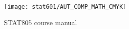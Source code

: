 
\texttt{[image: stat601/AUT\_COMP\_MATH\_CMYK]}

\begin{centering}
{\Huge STAT805 course manual}
\end{centering}


